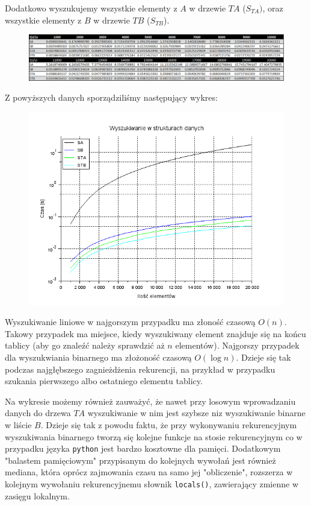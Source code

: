 \documentclass{article}
\begin{document}
Dodatkowo wyszukujemy wszystkie elementy z $A$ w drzewie $TA$ ($S_{TA})$, oraz wszystkie elementy z $B$ w drzewie $TB$ ($S_{TB}$).

\begin{figure}[h]
\centering
  \includegraphics[width=1.0\linewidth]{wyszukiwanie_tabela}
  \label{fig:szukanie_tabela}
\end{figure}%

\pagebreak
Z powyższych danych sporządziliśmy następujący wykres:

\begin{figure}[h]
\centering
  \includegraphics[width=0.5\linewidth]{wyszukiwanie}
  \label{fig:wyszukiwanie}
\end{figure}%

Wyszukiwanie liniowe w najgorszym przypadku ma złoność czasową $O(n)$. Takowy przypadek ma miejsce, kiedy wyszukiwany element znajduje się na końcu tablicy (aby go znaleźć należy sprawdzić aż $n$ elementów). Najgorszy przypadek dla wyszukwiania binarnego ma złożoność czasową $O(\log n)$. Dzieje się tak podczas najgłębszego zagnieżdżenia rekurencji, na przykład w przypadku szukania pierwszego albo ostatniego elementu tablicy.

Na wykresie możemy również zauważyć, że nawet przy losowym wprowadzaniu danych do drzewa $TA$ wyszukiwanie w nim jest szybsze niz wyszukiwanie binarne w liście $B$. Dzieje się tak z powodu faktu, że przy wykonywaniu rekurencyjnym wyszukiwania binarnego tworzą się kolejne funkcje na stosie rekurencyjnym co w przypadku języka \verb+python+ jest bardzo kosztowne dla pamięci. Dodatkowym "balastem pamięciowym" przypisanym do kolejnych wywołań jest również mediana, która oprócz zajmowania czasu na samo jej "obliczenie", rozszerza w kolejnym wywołaniu rekurencyjnemu słownik \verb+locals()+, zawierający zmienne w zasięgu lokalnym.
\end{document}
